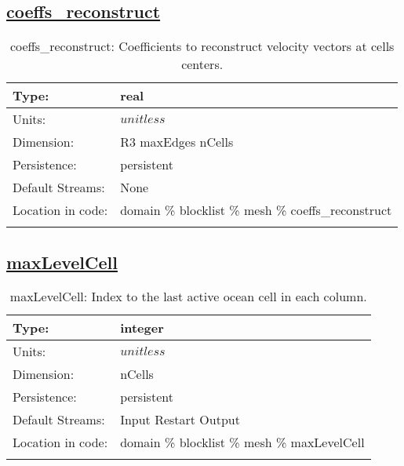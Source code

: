 \subsection[coeffs\_reconstruct]{\hyperref[sec:var_tab_mesh]{coeffs\_reconstruct}}
\label{subsec:var_sec_mesh_coeffs_reconstruct}
\begin{center}
\begin{longtable}{| p{2.0in} | p{4.0in} |}
        \hline 
        Type: & real \\
        \hline 
        Units: & $unitless$ \\
        \hline 
        Dimension: & R3 maxEdges nCells \\
        \hline 
        Persistence: & persistent \\
        \hline 
		 Default Streams: & None \\
        \hline 
		 Location in code: & domain \% blocklist \% mesh \% coeffs\_reconstruct \\
		 \hline 
    \caption{coeffs\_reconstruct: Coefficients to reconstruct velocity vectors at cells centers.}
\end{longtable}
\end{center}
\subsection[maxLevelCell]{\hyperref[sec:var_tab_mesh]{maxLevelCell}}
\label{subsec:var_sec_mesh_maxLevelCell}
\begin{center}
\begin{longtable}{| p{2.0in} | p{4.0in} |}
        \hline 
        Type: & integer \\
        \hline 
        Units: & $unitless$ \\
        \hline 
        Dimension: & nCells \\
        \hline 
        Persistence: & persistent \\
        \hline 
		 Default Streams: & Input Restart Output  \\
        \hline 
		 Location in code: & domain \% blocklist \% mesh \% maxLevelCell \\
		 \hline 
    \caption{maxLevelCell: Index to the last active ocean cell in each column.}
\end{longtable}
\end{center}
